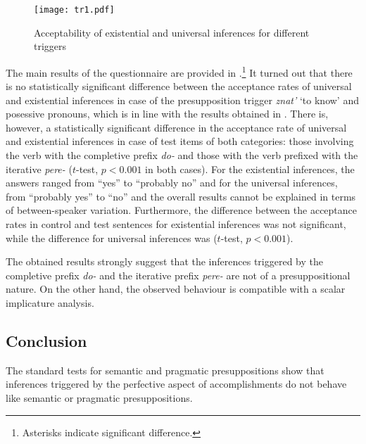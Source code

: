 \begin{figure}
\texttt{[image: tr1.pdf]}
\caption{Acceptability of existential and universal inferences for different triggers}
\label{fig:results}
\end{figure}

The main results of the questionnaire are provided in .\footnote{Asterisks indicate significant difference.} It turned out that there is no statistically significant difference between the acceptance rates of universal and existential inferences in case of the presupposition trigger \textit{znat'} `to know' and posessive pronouns, which is in line with the results obtained in \citealt{Chemla:09}. There is, however, a statistically significant difference in the acceptance rate of universal and existential inferences in case of test items of both categories: those involving the verb with the completive  prefix \textit{do-}   and those with the verb prefixed with the iterative \textit{pere-}   ($t$-test, $p<0.001$ in both cases). For the existential inferences, the answers ranged from ``yes'' to ``probably no'' and for the universal inferences, from ``probably yes'' to ``no'' and the overall results cannot be explained in terms of between-speaker variation. Furthermore, the difference between the acceptance rates in control and
test sentences for existential inferences was not significant, while the
difference for universal inferences was ($t$-test, $p<0.001$).

The obtained results strongly suggest that the inferences triggered by the completive  prefix \textit{do-}   and the iterative prefix \textit{pere-}   are not of a presuppositional nature. On the other hand, the observed behaviour is compatible with a scalar implicature analysis.

\subsection{Conclusion}
The standard tests for semantic and pragmatic presuppositions show that inferences triggered by the perfective aspect of accomplishments do not behave like semantic or pragmatic presuppositions.


